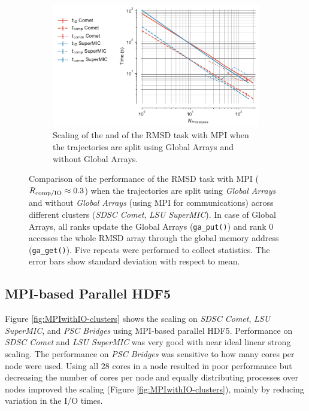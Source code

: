 \begin{figure}[!htb]
  \begin{subfigure} {.8\textwidth}
    \includegraphics[width=\linewidth]{figures/Clusters_IO_compute_scaling_splitting.pdf}
    \captionsetup{format=hang}
    \caption{Scaling of the \tcomp and \tIO of the RMSD task with MPI when the trajectories are split using Global Arrays and without Global Arrays.}
    \label{fig:compute-IO-scaling-clusters-splitting}
  \end{subfigure}
  \caption{Comparison of the performance of the RMSD task with MPI ($R_{\text{comp/IO}} \approx 0.3$) when the trajectories are split using \emph{Global Arrays} and without \emph{Global Arrays} (using MPI for communications) across different clusters (\emph{SDSC Comet}, \emph{LSU SuperMIC}). 
    In case of Global Arrays, all ranks update the Global Arrays (\texttt{ga\_put()}) and rank 0 accesses the whole RMSD array through the global memory address (\texttt{ga\_get()}).
    Five repeats were performed to collect statistics.
    The error bars show standard deviation with respect to mean.}
\label{fig:MPI-splitting-clusters}
\end{figure} 

\subsection{MPI-based Parallel HDF5}
Figure \ref{fig:MPIwithIO-clusters} shows the scaling on \emph{SDSC Comet}, \emph{LSU SuperMIC}, and \emph{PSC Bridges} using MPI-based parallel HDF5.  
Performance on \emph{SDSC Comet} and \emph{LSU SuperMIC} was very good with near ideal linear strong scaling.
The performance on \emph{PSC Bridges} was sensitive to how many cores per node were used.
Using all 28 cores in a node resulted in poor performance but decreasing the number of cores per node and  equally distributing processes over nodes improved the scaling (Figure \ref{fig:MPIwithIO-clusters}), mainly by reducing variation in the I/O times.

